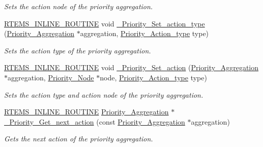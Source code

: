 \begin{DoxyCompactItemize}
\begin{DoxyCompactList}\small\item\em Sets the action node of the priority aggregation. \end{DoxyCompactList}\item 
\mbox{\hyperlink{group__RTEMSScoreBaseDefs_gac216239df231d5dbd15e3520b0b9313f}{R\+T\+E\+M\+S\+\_\+\+I\+N\+L\+I\+N\+E\+\_\+\+R\+O\+U\+T\+I\+NE}} void \mbox{\hyperlink{group__RTEMSScorePriority_ga0557d9c3a8c3c6d33705c9619c72ac84}{\+\_\+\+Priority\+\_\+\+Set\+\_\+action\+\_\+type}} (\mbox{\hyperlink{structPriority__Aggregation}{Priority\+\_\+\+Aggregation}} $\ast$aggregation, \mbox{\hyperlink{group__RTEMSScorePriority_gae6fceeae8a1c66316277dc3b52e3ba27}{Priority\+\_\+\+Action\+\_\+type}} type)
\begin{DoxyCompactList}\small\item\em Sets the action type of the priority aggregation. \end{DoxyCompactList}\item 
\mbox{\hyperlink{group__RTEMSScoreBaseDefs_gac216239df231d5dbd15e3520b0b9313f}{R\+T\+E\+M\+S\+\_\+\+I\+N\+L\+I\+N\+E\+\_\+\+R\+O\+U\+T\+I\+NE}} void \mbox{\hyperlink{group__RTEMSScorePriority_ga22ce55962b30d24d69e874c247c4e5cd}{\+\_\+\+Priority\+\_\+\+Set\+\_\+action}} (\mbox{\hyperlink{structPriority__Aggregation}{Priority\+\_\+\+Aggregation}} $\ast$aggregation, \mbox{\hyperlink{structPriority__Node}{Priority\+\_\+\+Node}} $\ast$node, \mbox{\hyperlink{group__RTEMSScorePriority_gae6fceeae8a1c66316277dc3b52e3ba27}{Priority\+\_\+\+Action\+\_\+type}} type)
\begin{DoxyCompactList}\small\item\em Sets the action type and action node of the priority aggregation. \end{DoxyCompactList}\item 
\mbox{\hyperlink{group__RTEMSScoreBaseDefs_gac216239df231d5dbd15e3520b0b9313f}{R\+T\+E\+M\+S\+\_\+\+I\+N\+L\+I\+N\+E\+\_\+\+R\+O\+U\+T\+I\+NE}} \mbox{\hyperlink{structPriority__Aggregation}{Priority\+\_\+\+Aggregation}} $\ast$ \mbox{\hyperlink{group__RTEMSScorePriority_gae4ca26c57754bbcd572d40ee95e38fd5}{\+\_\+\+Priority\+\_\+\+Get\+\_\+next\+\_\+action}} (const \mbox{\hyperlink{structPriority__Aggregation}{Priority\+\_\+\+Aggregation}} $\ast$aggregation)
\begin{DoxyCompactList}\small\item\em Gets the next action of the priority aggregation. \end{DoxyCompactList}\item 

\end{DoxyCompactItemize}
